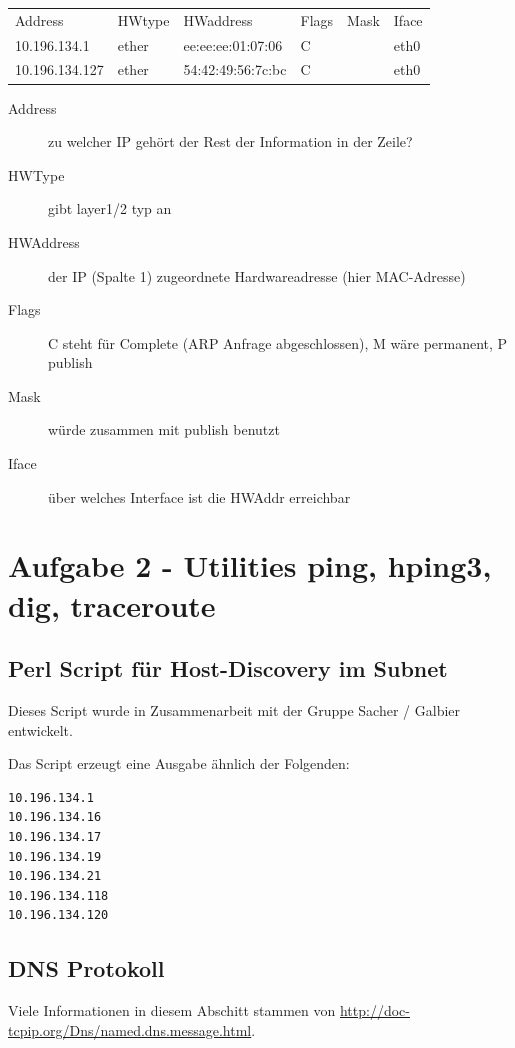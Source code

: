 \documentclass[a4paper,11pt]{scrartcl}
\begin{document}
\begin{tabular}{l|l|l|l|l|l}
	Address & HWtype & HWaddress & Flags & Mask & Iface \\
	10.196.134.1	&	ether	&	ee:ee:ee:01:07:06	&	C	&	&	eth0 \\
	10.196.134.127	&	ether   &	54:42:49:56:7c:bc	&	C	&	&	eth0
\end{tabular}
\begin{description}
	\item[Address] zu welcher IP gehört der Rest der Information in der Zeile?
	\item[HWType] gibt layer1/2 typ an
	\item[HWAddress] der IP (Spalte 1) zugeordnete Hardwareadresse (hier MAC-Adresse)
	\item[Flags] C steht für Complete (ARP Anfrage abgeschlossen), M wäre permanent, P publish
	\item[Mask] würde zusammen mit publish benutzt
	\item[Iface] über welches Interface ist die HWAddr erreichbar
\end{description}


\FloatBarrier
\newpage
\section{Aufgabe 2 - Utilities ping, hping3, dig, traceroute}
\subsection{Perl Script für Host-Discovery im Subnet}
Dieses Script wurde in Zusammenarbeit mit der Gruppe Sacher / Galbier entwickelt.


Das Script erzeugt eine Ausgabe ähnlich der Folgenden:
\begin{lstlisting}
10.196.134.1
10.196.134.16
10.196.134.17
10.196.134.19
10.196.134.21
10.196.134.118
10.196.134.120
\end{lstlisting}

\FloatBarrier
\subsection{DNS Protokoll}
Viele Informationen in diesem Abschitt stammen von \url{http://doc-tcpip.org/Dns/named.dns.message.html}.
\end{document}
